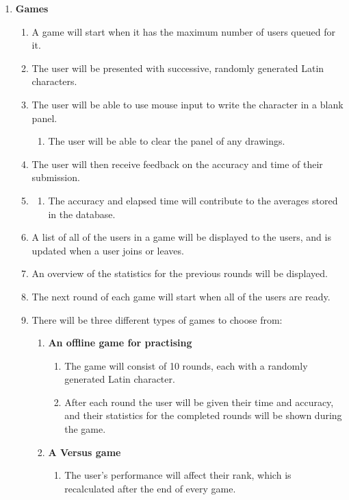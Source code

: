 \documentclass{article}
\begin{document}
\begin{enumerate}
    \item \textbf{Games}
    \begin{enumerate}
        \item A game will start when it has the maximum number of users queued for it.
        \item The user will be presented with successive, randomly generated Latin characters.
        \item The user will be able to use mouse input to write the character in a blank panel.
        \begin{enumerate}
            \item The user will be able to clear the panel of any drawings.
        \end{enumerate}
        \item The user will then receive feedback on the accuracy and time of their submission.
        \item \begin{enumerate}
            \item The accuracy and elapsed time will contribute to the averages stored in the database.
        \end{enumerate}
        \item A list of all of the users in a game will be displayed to the users, and is updated when a user joins or leaves.
        \item An overview of the statistics for the previous rounds will be displayed.
        \item The next round of each game will start when all of the users are ready.
        \item There will be three different types of games to choose from:
        \begin{enumerate}
            \item \textbf{An offline game for practising}
            \begin{enumerate}
                \item The game will consist of 10 rounds, each with a randomly generated Latin character.
                \item After each round the user will be given their time and accuracy, and their statistics for the completed rounds will be shown during the game.
            \end{enumerate}
            \item \textbf{A Versus game}
            \begin{enumerate}
                \item The user's performance will affect their rank, which is recalculated after the end of every game.

\end{enumerate}
\end{enumerate}
\end{enumerate}
\end{enumerate}
\end{document}

